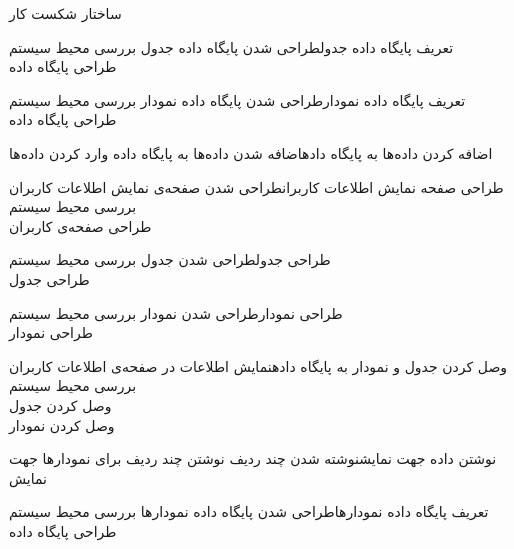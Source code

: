 \begin{wbsbox}{ساختار شکست کار}
\begin{wbssub}{تعریف پایگاه داده جدول}{طراحی شدن پایگاه داده جدول}{}
\task بررسی محیط سیستم  \\
\task طراحی پایگاه داده
\end{wbssub}

\begin{wbssub}{تعریف پایگاه داده نمودار}{طراحی شدن پایگاه داده نمودار}{}
\task بررسی محیط سیستم  \\
\task طراحی پایگاه داده
\end{wbssub}

\begin{wbssub}{اضافه کردن داده‌ها به پایگاه داده}{اضافه شدن داده‌ها به پایگاه داده}{}
\task وارد کردن داده‌ها
\end{wbssub}

\begin{wbssub}{طراحی صفحه نمایش اطلاعات کاربران}{طراحی شدن صفحه‌ی نمایش اطلاعات کاربران}{}
\task بررسی محیط سیستم  \\
\task طراحی صفحه‌ی کاربران
\end{wbssub}

\begin{wbssub}{طراحی جدول}{طراحی شدن جدول}{}
\task بررسی محیط سیستم  \\
\task طراحی جدول
\end{wbssub}

\begin{wbssub}{طراحی نمودار}{طراحی شدن نمودار}{}
\task بررسی محیط سیستم  \\
\task طراحی نمودار
\end{wbssub}

\begin{wbssub}{وصل کردن جدول و نمودار به پایگاه داده}{نمایش اطلاعات در صفحه‌ی اطلاعات کاربران}{}
\task بررسی محیط سیستم  \\
\task وصل کردن جدول \\
\task وصل کردن نمودار
\end{wbssub}

\begin{wbssub}{نوشتن داده جهت نمایش}{نوشته شدن چند ردیف}{}
\task نوشتن چند ردیف برای نمودارها جهت نمایش
\end{wbssub}

\begin{wbssub}{تعریف پایگاه داده نمودارها}{طراحی شدن پایگاه داده نمودارها}{}
\task بررسی محیط سیستم  \\
\task طراحی پایگاه داده
\end{wbssub}


\end{wbsbox}
